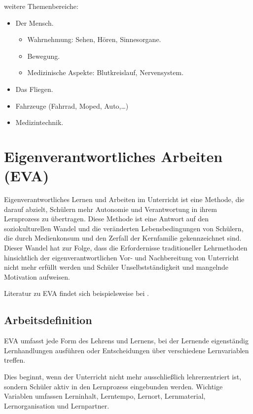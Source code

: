 weitere Themenbereiche:
\begin{itemize}
\setlength{\itemsep}{0mm}
\item Der Mensch.
\begin{itemize}
\setlength{\itemsep}{0mm}
\item
Wahrnehmung: Sehen, H\"{o}ren, Sinnesorgane.
\item
Bewegung.
\item
Medizinische Aspekte: Blutkreislauf, Nervensystem.
\end{itemize}
	\item Das Fliegen.
	\item Fahrzeuge (Fahrrad, Moped, Auto,\dots)
	\item Medizintechnik.
\end{itemize}


\section{Eigenverantwortliches Arbeiten (EVA)}\label{EVA}

Eigenverantwortliches Lernen und Arbeiten im Unterricht ist eine Methode, die darauf abzielt, Sch\"ulern mehr Autonomie und Verantwortung in ihrem Lernprozess zu \"ubertragen. Diese Methode ist eine Antwort auf den soziokulturellen Wandel und die ver\"anderten Lebensbedingungen von Sch\"ulern, die durch Medienkonsum und den Zerfall der Kernfamilie gekennzeichnet sind. Dieser Wandel hat zur Folge, dass die Erfordernisse traditioneller Lehrmethoden hinsichtlich der eigenverantwortlichen Vor- und Nachbereitung von Unterricht nicht mehr erf\"ullt werden und Sch\"uler Unselbstst\"andigkeit und mangelnde Motivation aufweisen. 

Literatur zu EVA findet sich beispielsweise bei \textcites{Klippert,Landherr}.

\subsection{Arbeitsdefinition}
EVA umfasst jede Form des Lehrens und Lernens, bei der Lernende eigenständig Lernhandlungen ausführen oder Entscheidungen über verschiedene Lernvariablen treffen.

Dies beginnt, wenn der Unterricht nicht mehr ausschließlich lehrerzentriert ist, sondern Schüler aktiv in den Lernprozess eingebunden werden. Wichtige Variablen umfassen Lerninhalt, Lerntempo, Lernort, Lernmaterial, Lernorganisation und Lernpartner.

